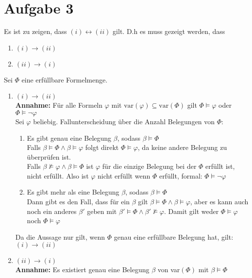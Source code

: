 \documentclass[a4paper,10pt]{article}
\begin{document}
\section*{Aufgabe 3}
Es ist zu zeigen, dass \((i) \leftrightarrow (ii) \) gilt. D.h es muss gezeigt werden, dass
 	\begin{enumerate}
 		\item 	\( (i) \rightarrow (ii) \)
 		\item 	\( (ii) \rightarrow (i)\)
 	\end{enumerate}
 	Sei $\Phi$ eine erfüllbare Formelmenge.
 	\begin{enumerate}
 		\item 	\( (i) \rightarrow (ii)\) \\
 			\textbf{Annahme: } Für alle Formeln \(\varphi\) mit \( \text{var}(\varphi)  \subseteq \text{var}(\Phi)\) gilt \(\Phi \vDash \varphi  \) oder \(\Phi \vDash \lnot \varphi\) \\
 			Sei $\varphi$ beliebig. Fallunterscheidung über die Anzahl Belegungen von $\Phi$:
 			\begin{enumerate}
 				\item 	Es gibt genau eine Belegung $\beta$, sodass $\beta \vDash \Phi$ \\
 					Falls $\beta \vDash \Phi \land \beta \vDash \varphi$ folgt direkt \(\Phi \vDash \varphi  \), da keine andere Belegung zu überprüfen ist. \\
 					Falls $\beta \not \vDash \varphi \land \beta \vDash \Phi$ ist $\varphi$ für die einzige Belegung bei der $\Phi$ erfüllt ist, nicht erfüllt. Also ist $\varphi$ nicht erfüllt wenn $\Phi$ erfüllt, formal: \(\Phi \vDash \lnot \varphi  \)
 				\item 	Es gibt mehr als eine Belegung $\beta$, sodass $\beta \vDash \Phi$ \\
 					Dann gibt es den Fall, dass für ein $\beta$ gilt $\beta \vDash \Phi \land \beta \vDash \varphi$, aber es kann auch noch ein anderes $\beta'$ geben mit $\beta' \vDash \Phi \land \beta' \not \vDash \varphi$. Damit gilt weder $\Phi \vDash \varphi$ noch $\Phi \vDash \varphi$
 			\end{enumerate}
 			Da die Aussage nur gilt, wenn $\Phi$ genau eine erfüllbare Belegung hat, gilt: $(i) \rightarrow (ii)$
 		\item 	\( (ii) \rightarrow (i) \)	\\
 			\textbf{Annahme: } Es existiert genau eine Belegung \(\beta \) von var\((\Phi)\) mit \( \beta \vDash \Phi\)\\

\end{enumerate}
\end{document}
